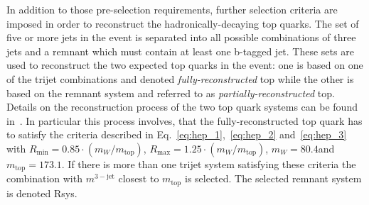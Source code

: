 In addition to those pre-selection requirements, further selection criteria are imposed in order to reconstruct the hadronically-decaying top quarks. The set of five or more jets in the event is separated into all possible combinations of three jets and a remnant which must contain at least one b-tagged jet. These sets are used to reconstruct the two expected top quarks in the event: one is based on one of the trijet combinations and denoted \textit{fully-reconstructed} top while the other is based on the remnant system and referred to as \textit{partially-reconstructed} top. Details on the reconstruction process of the two top quark systems can be found in~\cite{CMS-PAS-SUS-13-015}. In particular this process involves, that the fully-reconstructed top quark has to satisfy the criteria described in Eq.~\ref{eq:hep_1},~\ref{eq:hep_2} and~\ref{eq:hep_3} with $R_\mathrm{min} = 0.85 \cdot (m_W/m_\mathrm{top})$, $R_\mathrm{max} = 1.25 \cdot (m_W/m_\mathrm{top})$, $m_W = 80.4$\gev and $m_\mathrm{top} = 173.1$\gev. If there is more than one trijet system satisfying these criteria the combination with $m^{3-\mathrm{jet}}$ closest to $m_\mathrm{top}$ is selected. The selected remnant system is denoted Rsys. \\

